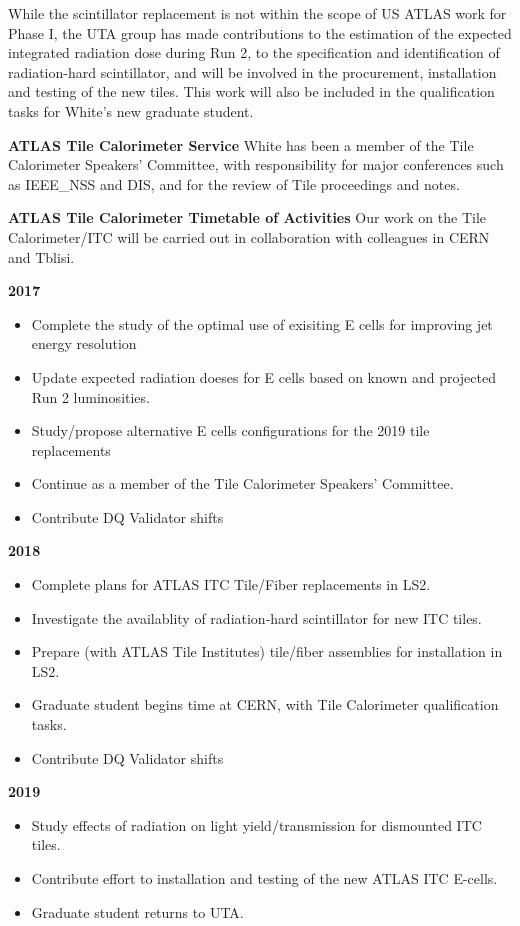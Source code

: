 While the scintillator replacement is not within the scope of US ATLAS work for Phase I, 
the UTA group has made contributions to the estimation of the expected integrated radiation dose during
Run 2, to the specification and identification of radiation-hard
scintillator, and will be involved in the procurement, installation and testing of the new
tiles. This work will also be included in the qualification tasks for White's new graduate student.

\textbf{ATLAS Tile Calorimeter Service}
White has been a member of the Tile Calorimeter Speakers' Committee, with responsibility for major conferences such as IEEE\_NSS and DIS, and for the review of Tile proceedings and notes.

\textbf{ATLAS Tile Calorimeter Timetable of Activities}
Our work on the Tile Calorimeter/ITC will be carried out in collaboration with colleagues
in CERN and Tblisi.

\textbf{2017}
\begin{itemize}[noitemsep,nolistsep]
\item{Complete the study of the optimal use of exisiting E cells for improving jet energy resolution}
\item{Update expected radiation doeses for E cells based on known and projected Run 2 luminosities.}
\item{Study/propose alternative E cells configurations for the 2019 tile replacements}
\item{Continue as a member of the Tile Calorimeter Speakers' Committee.}
\item{Contribute DQ Validator shifts}
\end{itemize}

\textbf{2018}
\begin{itemize}[noitemsep,nolistsep]
\item{Complete plans for ATLAS ITC Tile/Fiber replacements in LS2.}
\item{Investigate the availablity of radiation-hard scintillator for new ITC tiles.}
\item{Prepare (with ATLAS Tile Institutes) tile/fiber assemblies for installation in LS2.}
\item{Graduate student begins time at CERN, with Tile Calorimeter qualification tasks.}
\item{Contribute DQ Validator shifts}
\end{itemize}

\textbf{2019}
\begin{itemize}[noitemsep,nolistsep]
\item{Study effects of radiation on light yield/transmission for dismounted ITC tiles.}
\item{Contribute effort to installation and testing of the new ATLAS ITC E-cells.}
\item{Graduate student returns to UTA.}
\end{itemize}
